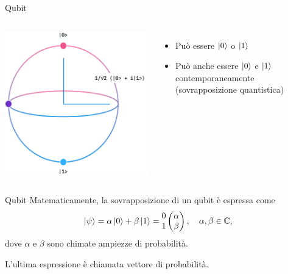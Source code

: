 \documentclass{beamer}
\begin{document}
    \begin{frame}{Qubit}
        \begin{columns}
            \includegraphics[width=\textwidth]{gfx/qubit_ibm.png}
            \begin{itemize}
                \item Può essere $\ket{0}$ o $\ket{1}$
                \item Può anche essere $\ket{0}$ e $\ket{1}$ contemporaneamente (sovrapposizione quantistica)
            \end{itemize}
        \end{columns}
    \end{frame}

    \begin{frame}{Qubit}
        Matematicamente, la sovrapposizione di un qubit è espressa come
        \begin{equation}
            \ket{\psi} = \alpha \ket{0} + \beta \ket{1} = \begin{matrix}
                0 \\ 1
            \end{matrix}\begin{pmatrix}
                \alpha \\ \beta
            \end{pmatrix}
            , \quad \alpha, \beta \in \mathbb{C}, 
        \end{equation}
        dove $\alpha$ e $\beta$ sono chimate ampiezze di probabilità. 
        
        L'ultima espressione è chiamata vettore di probabilità. 
    \end{frame}
\end{document}
